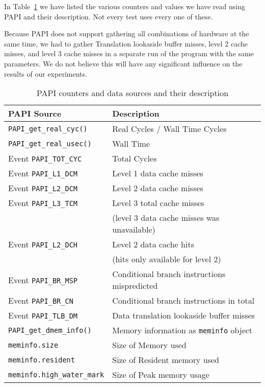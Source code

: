 In Table~\ref{papievents} we have listed the various counters and values we have read using PAPI and their description. Not every test uses every one of these.

Because PAPI does not support gathering all combinations of hardware at the same time, we had to gather Translation lookaside buffer misses, level 2 cache misses, and level 3 cache misses in a separate run of the program with the same parameters.
We do not believe this will have any significant influence on the results of our experiments.

\begin{table}
\caption{PAPI counters and data sources and their description}
\label{papievents}
\center
\begin{tabular}{|l|l|}
\hline
\textbf{PAPI Source}	& \textbf{Description} \\ \hline
\texttt{PAPI\_get\_real\_cyc()}	& Real Cycles / Wall Time Cycles \\ \hline
\texttt{PAPI\_get\_real\_usec()}	& Wall Time \\ \hline
Event \texttt{PAPI\_TOT\_CYC}	& Total Cycles \\ \hline
Event \texttt{PAPI\_L1\_DCM}		& Level 1 data cache misses \\ \hline
Event \texttt{PAPI\_L2\_DCM}		& Level 2 data cache misses \\ \hline
Event \texttt{PAPI\_L3\_TCM}		& Level 3 total cache misses\\
& (level 3 data cache misses was unavailable) \\ \hline
Event \texttt{PAPI\_L2\_DCH}		& Level 2 data cache hits \\
& (hits only available for level 2) \\ \hline
Event \texttt{PAPI\_BR\_MSP}		& Conditional branch instructions mispredicted \\ \hline
Event \texttt{PAPI\_BR\_CN}		& Conditional branch instructions in total \\ \hline
Event \texttt{PAPI\_TLB\_DM}		& Data translation lookaside buffer misses \\ \hline
\texttt{PAPI\_get\_dmem\_info()}	& Memory information as \texttt{meminfo} object \\ \hline
\texttt{meminfo.size}			& Size of Memory used \\ \hline
\texttt{meminfo.resident}		& Size of Resident memory used \\ \hline
\texttt{meminfo.high\_water\_mark}	& Size of Peak memory usage \\ \hline

\end{tabular}
\end{table}

